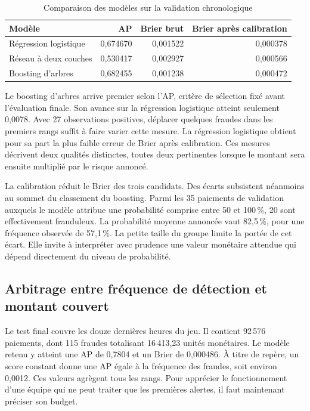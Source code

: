\documentclass[11pt,a4paper]{article}
\begin{document}
\begin{table}[htbp]
\centering
\caption{Comparaison des modèles sur la validation chronologique}
\label{tab:res-validation}
\small
\begin{tabular}{@{}lrrr@{}}
\toprule
Modèle & AP & Brier brut & Brier après calibration \\
\midrule
Régression logistique   & 0,674670 & 0,001522 & 0,000378 \\
Réseau à deux couches   & 0,530417 & 0,002927 & 0,000566 \\
Boosting d'arbres       & 0,682455 & 0,001238 & 0,000472 \\
\bottomrule
\end{tabular}
\end{table}

Le boosting d'arbres arrive premier selon l'AP, critère de sélection fixé avant l'évaluation finale. Son avance sur la régression logistique atteint seulement 0,0078. Avec 27 observations positives, déplacer quelques fraudes dans les premiers rangs suffit à faire varier cette mesure. La régression logistique obtient pour sa part la plus faible erreur de Brier après calibration. Ces mesures décrivent deux qualités distinctes, toutes deux pertinentes lorsque le montant sera ensuite multiplié par le risque annoncé.

La calibration réduit le Brier des trois candidats. Des écarts subsistent néanmoins au sommet du classement du boosting. Parmi les 35 paiements de validation auxquels le modèle attribue une probabilité comprise entre 50 et 100\,\%, 20 sont effectivement frauduleux. La probabilité moyenne annoncée vaut 82,5\,\%, pour une fréquence observée de 57,1\,\%. La petite taille du groupe limite la portée de cet écart. Elle invite à interpréter avec prudence une valeur monétaire attendue qui dépend directement du niveau de probabilité.

\subsection{Arbitrage entre fréquence de détection et montant couvert}

Le test final couvre les douze dernières heures du jeu. Il contient 92\,576 paiements, dont 115 fraudes totalisant 16\,413,23 unités monétaires. Le modèle retenu y atteint une AP de 0,7804 et un Brier de 0,000486. À titre de repère, un score constant donne une AP égale à la fréquence des fraudes, soit environ 0,0012. Ces valeurs agrègent tous les rangs. Pour apprécier le fonctionnement d'une équipe qui ne peut traiter que les premières alertes, il faut maintenant préciser son budget.
\end{document}
